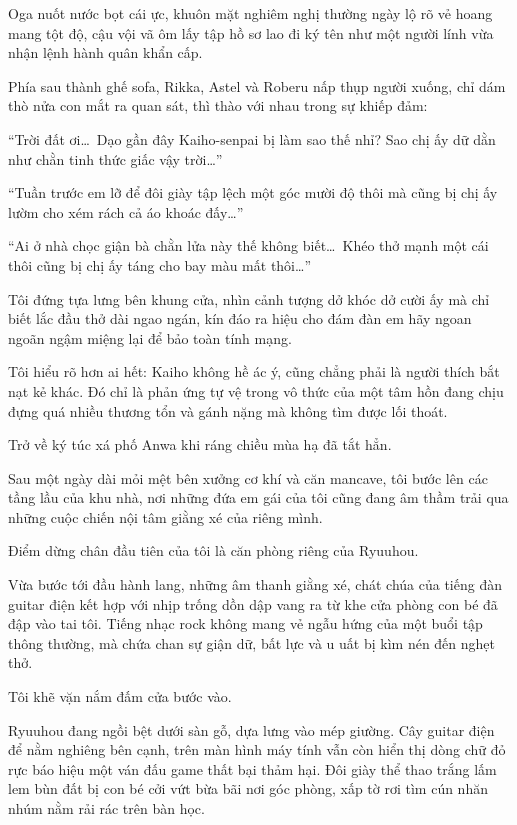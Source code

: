 \documentclass[../main.tex]{subfiles}
\begin{document}
Oga nuốt nước bọt cái ực, khuôn mặt nghiêm nghị thường ngày lộ rõ vẻ hoang mang tột độ, cậu vội vã ôm lấy tập hồ sơ lao đi ký tên như một người lính vừa nhận lệnh hành quân khẩn cấp.

Phía sau thành ghế sofa, Rikka, Astel và Roberu nấp thụp người xuống, chỉ dám thò nửa con mắt ra quan sát, thì thào với nhau trong sự khiếp đảm:

``Trời đất ơi\dots\ Dạo gần đây Kaiho-senpai bị làm sao thế nhỉ? Sao chị ấy dữ dằn như chằn tinh thức giấc vậy trời\dots''

``Tuần trước em lỡ để đôi giày tập lệch một góc mười độ thôi mà cũng bị chị ấy lườm cho xém rách cả áo khoác đấy\dots''

``Ai ở nhà chọc giận bà chằn lửa này thế không biết\dots\ Khéo thở mạnh một cái thôi cũng bị chị ấy táng cho bay màu mất thôi\dots''

Tôi đứng tựa lưng bên khung cửa, nhìn cảnh tượng dở khóc dở cười ấy mà chỉ biết lắc đầu thở dài ngao ngán, kín đáo ra hiệu cho đám đàn em hãy ngoan ngoãn ngậm miệng lại để bảo toàn tính mạng.

Tôi hiểu rõ hơn ai hết: Kaiho không hề ác ý, cũng chẳng phải là người thích bắt nạt kẻ khác. Đó chỉ là phản ứng tự vệ trong vô thức của một tâm hồn đang chịu đựng quá nhiều thương tổn và gánh nặng mà không tìm được lối thoát.

\ct

Trở về ký túc xá phố Anwa khi ráng chiều mùa hạ đã tắt hẳn.

Sau một ngày dài mỏi mệt bên xưởng cơ khí và căn mancave, tôi bước lên các tầng lầu của khu nhà, nơi những đứa em gái của tôi cũng đang âm thầm trải qua những cuộc chiến nội tâm giằng xé của riêng mình.

Điểm dừng chân đầu tiên của tôi là căn phòng riêng của Ryuuhou.

Vừa bước tới đầu hành lang, những âm thanh giằng xé, chát chúa của tiếng đàn guitar điện kết hợp với nhịp trống dồn dập vang ra từ khe cửa phòng con bé đã đập vào tai tôi. Tiếng nhạc rock không mang vẻ ngẫu hứng của một buổi tập thông thường, mà chứa chan sự giận dữ, bất lực và u uất bị kìm nén đến nghẹt thở.

Tôi khẽ vặn nắm đấm cửa bước vào.

Ryuuhou đang ngồi bệt dưới sàn gỗ, dựa lưng vào mép giường. Cây guitar điện để nằm nghiêng bên cạnh, trên màn hình máy tính vẫn còn hiển thị dòng chữ đỏ rực báo hiệu một ván đấu game thất bại thảm hại. Đôi giày thể thao trắng lấm lem bùn đất bị con bé cởi vứt bừa bãi nơi góc phòng, xấp tờ rơi tìm cún nhăn nhúm nằm rải rác trên bàn học.
\end{document}
